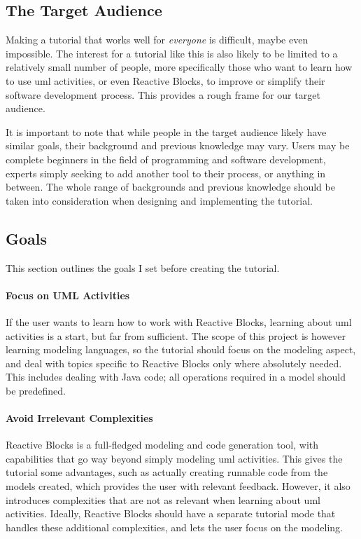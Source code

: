 \subsection{The Target Audience}
\label{sec:target_audience}
Making a tutorial that works well for \emph{everyone} is difficult, maybe even impossible. The interest for a tutorial like this is also likely to be limited to a relatively small number of people, more specifically those who want to learn how to use \gls{uml} activities, or even Reactive Blocks, to improve or simplify their software development process. This provides a rough frame for our target audience.

\noindent
It is important to note that while people in the target audience likely have similar goals, their background and previous knowledge may vary. Users may be complete beginners in the field of programming and software development, experts simply seeking to add another tool to their process, or anything in between. The whole range of backgrounds and previous knowledge should be taken into consideration when designing and implementing the tutorial.

\subsection{Goals}
\label{sec:tutorial_goals}
This section outlines the goals I set before creating the tutorial.

\paragraph{Focus on UML Activities} If the user wants to learn how to work with Reactive Blocks, learning about \gls{uml} activities is a start, but far from sufficient. The scope of this project is however learning modeling languages, so the tutorial should focus on the modeling aspect, and deal with topics specific to Reactive Blocks only where absolutely needed. This includes dealing with Java code; all operations required in a model should be predefined.

\paragraph{Avoid Irrelevant Complexities} Reactive Blocks is a full-fledged modeling and code generation tool, with capabilities that go way beyond simply modeling \gls{uml} activities. This gives the tutorial some advantages, such as actually creating runnable code from the models created, which provides the user with relevant feedback. However, it also introduces complexities that are not as relevant when learning about \gls{uml} activities. Ideally, Reactive Blocks should have a separate tutorial mode that handles these additional complexities, and lets the user focus on the modeling.

